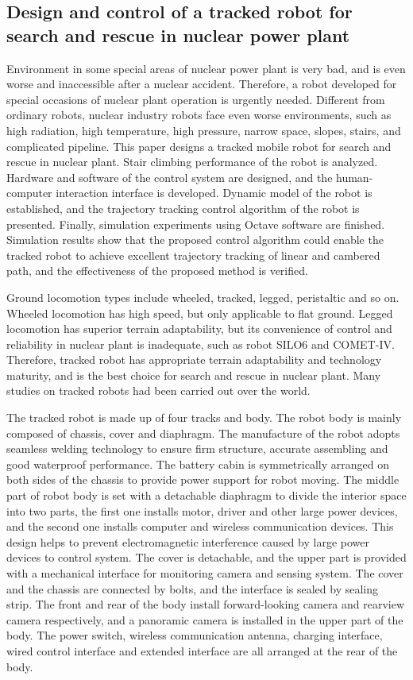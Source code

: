 \documentclass{romjist}
\begin{document}
\subsection{Design and control of a tracked robot for search and rescue in nuclear power plant}
\cite{6}Environment in some special areas of nuclear power plant is very bad, and is even worse and inaccessible after a nuclear accident. Therefore, a robot developed for special occasions of nuclear plant operation is urgently needed. Different from ordinary robots, nuclear industry robots face even worse environments, such as high radiation, high temperature, high pressure, narrow space, slopes, stairs, and complicated pipeline. This paper designs a tracked mobile robot for search and rescue in nuclear plant. Stair climbing performance of the robot is analyzed. Hardware and software of the control system are designed, and the human-computer interaction interface is developed. Dynamic model of the robot is established, and the trajectory tracking control algorithm of the robot is presented. Finally, simulation experiments using Octave software are finished. Simulation results show that the proposed control algorithm could enable the tracked robot to achieve excellent trajectory tracking of linear and cambered path, and the effectiveness of the proposed method is verified.\par
Ground locomotion types include wheeled, tracked, legged, peristaltic and so on. Wheeled locomotion has high speed, but only applicable to flat ground. Legged locomotion has superior terrain adaptability, but its convenience of control and reliability in nuclear plant is inadequate, such as robot SILO6 and COMET-IV. Therefore, tracked robot has appropriate terrain adaptability and technology maturity, and is the best choice for search and rescue in nuclear plant. Many studies on tracked robots had been carried out over the world.\par
The tracked robot is made up of four tracks and body. The robot body is mainly composed of chassis, cover and diaphragm. The manufacture of the robot adopts seamless welding technology to ensure firm structure, accurate assembling and good waterproof performance. The battery cabin is symmetrically arranged on both sides of the chassis to provide power support for robot moving. The middle part of robot body is set with a detachable diaphragm to divide the interior space into two parts, the first one installs motor, driver and other large power devices, and the second one installs computer and wireless communication devices. This design helps to prevent electromagnetic interference caused by large power devices to control system. The cover is detachable, and the upper part is provided with a mechanical interface for monitoring camera and sensing system. The cover and the chassis are connected by bolts, and the interface is sealed by sealing strip. The front and rear of the body install forward-looking camera and rearview camera respectively, and a panoramic camera is installed in the upper part of the body. The power switch, wireless communication antenna, charging interface, wired control interface and extended interface are all arranged at the rear of the body.\par
\end{document}

